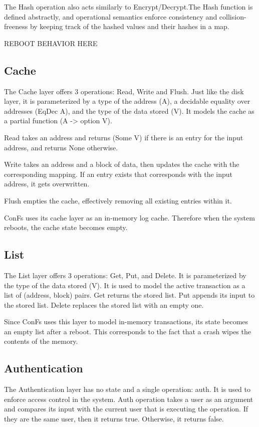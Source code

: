 The Hash operation also acts similarly to Encrypt/Decrypt.The Hash function is defined abstractly, and operational semantics enforce consistency and collision-freeness by keeping track of the hashed values and their hashes in a map.

{\color{red} REBOOT BEHAVIOR HERE}

\subsection{Cache}
The Cache layer offers 3 operations: Read, Write and Flush. Just like the disk layer, it is parameterized by a type of the address (A), a decidable equality over addresses (EqDec A), and the type of the data stored (V). It models the cache as a partial function (A -> option V).

Read takes an address and returns (Some V) if there is an entry for the input address, and returns None otherwise.

Write takes an address and a block of data, then updates the cache with the corresponding mapping. If an entry exists that corresponds with the input address, it gets overwritten.

Flush empties the cache, effectively removing all existing entries within it.

ConFs uses its cache layer as an in-memory log cache. Therefore when the system reboots, the cache state becomes empty.

\subsection{List}
The List layer offers 3 operations: Get, Put, and Delete. It is parameterized by the type of the data stored (V). It is used to model the active transaction as a list of (address, block) pairs. Get returns the stored list. Put appends its input to the stored list. Delete replaces the stored list with an empty one. 

Since ConFs uses this layer to model in-memory transactions, its state becomes an empty list after a reboot. This corresponds to the fact that a crash wipes the contents of the memory.


\subsection{Authentication}
The Authentication layer has no state and a single operation: auth. It is used to enforce access control in the system. Auth operation takes a user as an argument and compares its input with the current user that is executing the operation. If they are the same user, then it returns true. Otherwise, it returns false.

